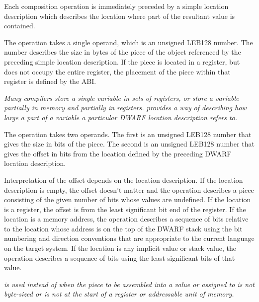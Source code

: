 Each composition operation is immediately preceded by a simple
location description which describes the location where part
of the resultant value is contained.
\begin{enumerate}[1. ]
\itembfnl{\DWOPpieceTARG}
The \DWOPpieceNAME{} operation takes a 
single operand, which is an
unsigned LEB128 number.  
The number describes the size in bytes
of the piece of the object referenced by the preceding simple
location description. If the piece is located in a register,
but does not occupy the entire register, the placement of
the piece within that register is defined by the ABI.

\textit{Many compilers store a single variable in sets of registers,
or store a variable partially in memory and partially in
registers. \DWOPpieceNAME{} provides a way of describing how large
a part of a variable a particular DWARF location description
refers to.}

\itembfnl{\DWOPbitpieceTARG}
The \DWOPbitpieceNAME{} operation takes two operands. 
The first is an unsigned LEB128 
number that gives the size in bits
of the piece. The second is an 
unsigned LEB128 number that
gives the offset in bits from the location defined by the
preceding DWARF location description.  

Interpretation of the offset depends on the location description. 
If the location description is empty, the offset 
doesn\textquoteright{}t matter and
the \DWOPbitpieceNAME{} operation describes a piece consisting
of the given number of bits whose values are undefined. If
the location is a register, the offset is from the least
significant bit end of the register. If the location is a
memory address, the \DWOPbitpieceNAME{} operation describes a
sequence of bits relative to the location whose address is
on the top of the DWARF stack using the bit numbering and
direction conventions that are appropriate to the current
language on the target system. If the location is any implicit
value or stack value, the \DWOPbitpieceNAME{} operation describes
a sequence of bits using the least significant bits of that
value.  
\end{enumerate}

\textit{\DWOPbitpieceNAME{} is 
used instead of \DWOPpieceNAME{} when
the piece to be assembled into a value or assigned to is not
byte-sized or is not at the start of a register or addressable
unit of memory.}

